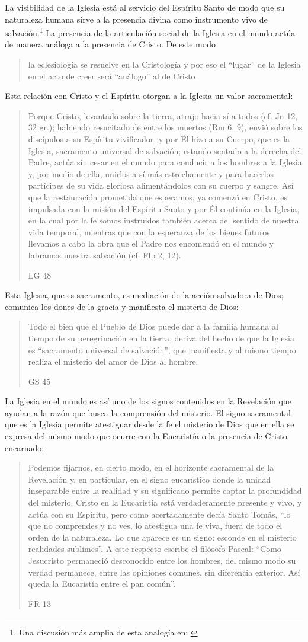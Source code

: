 La visibilidad de la Iglesia está al servicio del Espíritu Santo de modo que su naturaleza humana sirve a la presencia divina como instrumento vivo de salvación.\footnote{Una discusión más amplia de esta analogía en: \cite[292ss]{ninot2009tf}} La presencia de la articulación social de la Iglesia en el mundo actúa de manera análoga a la presencia de Cristo. De este modo \blockquote[{\cite[566]{ninot2009tf}}]{la eclesiología se resuelve en la Cristología y por eso el \enquote{lugar} de la Iglesia en el acto de creer será \enquote{análogo} al de Cristo}. Esta relación con Cristo y el Espíritu otorgan a la Iglesia un valor sacramental: \blockquote[LG 48]{Porque Cristo, levantado sobre la tierra, atrajo hacia sí a todos (cf. Jn 12, 32 gr.); habiendo resucitado de entre los muertos (Rm 6, 9), envió sobre los discípulos a su Espíritu vivificador, y por Él hizo a su Cuerpo, que es la Iglesia, sacramento universal de salvación; estando sentado a la derecha del Padre, actúa sin cesar en el mundo para conducir a los hombres a la Iglesia y, por medio de ella, unirlos a sí más estrechamente y para hacerlos partícipes de su vida gloriosa alimentándolos con su cuerpo y sangre. Así que la restauración prometida que esperamos, ya comenzó en Cristo, es impulsada con la misión del Espíritu Santo y por Él continúa en la Iglesia, en la cual por la fe somos instruidos también acerca del sentido de nuestra vida temporal, mientras que con la esperanza de los bienes futuros llevamos a cabo la obra que el Padre nos encomendó en el mundo y labramos nuestra salvación (cf. Flp 2, 12).} Esta Iglesia, que es sacramento, es mediación de la acción salvadora de Dios; comunica los dones de la gracia y manifiesta el misterio de Dios: \blockquote[GS 45]{Todo el bien que el Pueblo de Dios puede dar a la familia humana al tiempo de su peregrinación en la tierra, deriva del hecho de que la Iglesia es ``sacramento universal de salvación'', que manifiesta y al mismo tiempo realiza el misterio del amor de Dios al hombre.}

La Iglesia en el mundo es así uno de los signos contenidos en la Revelación que ayudan a la razón que busca la comprensión del misterio. El signo sacramental que es la Iglesia permite atestiguar desde la fe el misterio de Dios que en ella se expresa del mismo modo que ocurre con la Eucaristía o la presencia de Cristo encarnado: \blockquote[FR 13]{Podemos fijarnos, en cierto modo, en el horizonte sacramental de la Revelación y, en particular, en el signo eucarístico donde la unidad inseparable entre la realidad y su significado permite captar la profundidad del misterio. Cristo en la Eucaristía está verdaderamente presente y vivo, y actúa con su Espíritu, pero como acertadamente decía Santo Tomás, \enquote{lo que no comprendes y no ves, lo atestigua una fe viva, fuera de todo el orden de la naturaleza. Lo que aparece es un signo: esconde en el misterio realidades sublimes}. A este respecto escribe el filósofo Pascal: \enquote{Como Jesucristo permaneció desconocido entre los hombres, del mismo modo su verdad permanece, entre las opiniones comunes, sin diferencia exterior. Así queda la Eucaristía entre el pan común}.}


